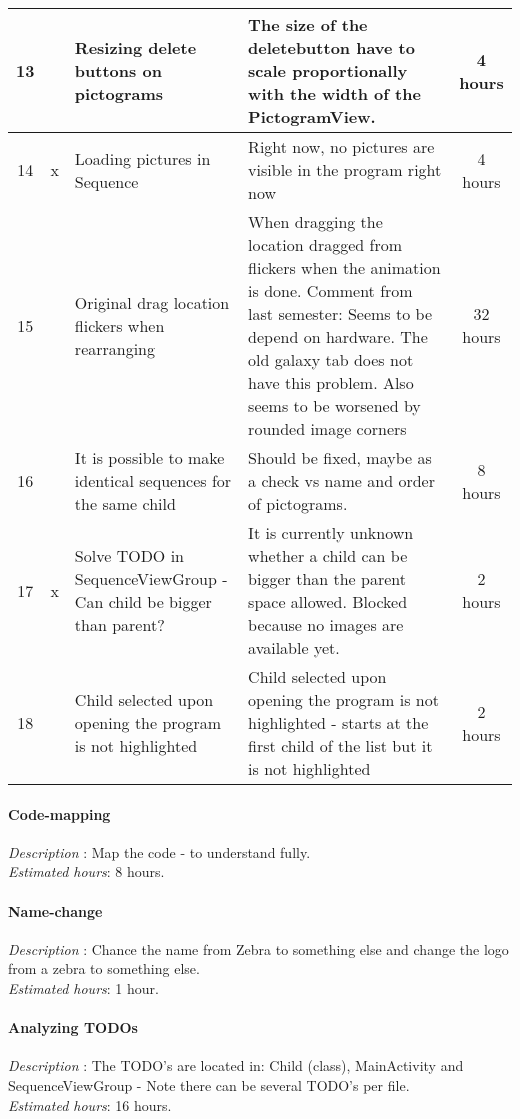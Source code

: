 \begin{longtable} { | c | c | p{5cm} | p{5cm} | c | }
	13	& 		&	Resizing delete buttons on pictograms	&	The size of the deletebutton have to scale proportionally with the width of the PictogramView.	&	4 hours	\\\hline
	14	& 	x	&	Loading pictures in Sequence	&	Right now, no pictures are visible in the program right now	&	4 hours	\\\hline
	15	& 		&	Original drag location flickers when rearranging	&	When dragging the location dragged from flickers when the animation is done. Comment from last semester: Seems to be depend on hardware. The old galaxy tab does not have this problem. Also seems to be worsened by rounded image corners	&	32 hours 	\\\hline
	16	& 		&	It is possible to make identical sequences for the same child	&	Should be fixed, maybe as a check vs name and order of pictograms.	&	8 hours	\\\hline
	17	& 	x	&	Solve TODO in SequenceViewGroup - Can child be bigger than parent?	&	It is currently unknown whether a child can be bigger than the parent space allowed. Blocked because no images are available yet.	&	2 hours	\\\hline
	18	& 		&	Child selected upon opening the program is not highlighted	&	Child selected upon opening the program is not highlighted - starts at the first child of the list but it is not highlighted	&	2 hours	\\\hline

\end{longtable}




\paragraph{Code-mapping}
\emph{Description} : Map the code - to understand fully.\\
\emph{Estimated hours}: 8 hours.
\paragraph{Name-change}
\emph{Description} : Chance the name from Zebra to something else and change the logo from a zebra to something else.\\
\emph{Estimated hours}: 1 hour.
\paragraph{Analyzing TODOs}
\emph{Description} : The TODO's are located in: Child (class), MainActivity and SequenceViewGroup - Note there can be several TODO's per file. \\
\emph{Estimated hours}: 16 hours.
